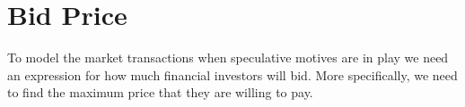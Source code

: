 







\section{Bid Price}
To model the market transactions when speculative motives are in play we need an expression for how much financial investors will bid. More specifically, we need to find the maximum price that they are willing to pay. 


